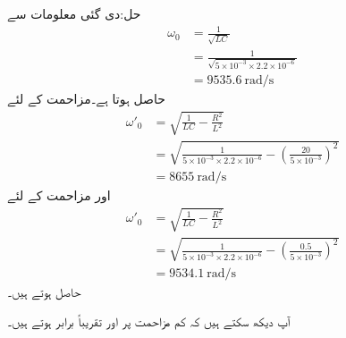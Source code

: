 حل:دی گئی معلومات سے
\begin{align*}
\omega_0&=\frac{1}{\sqrt{LC}}\\
&=\frac{1}{\sqrt{5\times 10^{-3} \times 2.2 \times 10^{-6}}}\\
&=\SI{9535.6}{\radian\per\second}
\end{align*}
حاصل ہوتا ہے۔مزاحمت  کے لئے
\begin{align*}
\omega'_0&=\sqrt{\frac{1}{LC}-\frac{R^2}{L^2}}\\
&=\sqrt{\frac{1}{5\times 10^{-3}\times 2.2 \times 10^{-6}} -\left(\frac{20}{5\times 10^{-3}}\right)^2}\\
&=\SI{8655}{\radian\per\second}
\end{align*}
اور مزاحمت  کے لئے
\begin{align*}
\omega'_0&=\sqrt{\frac{1}{LC}-\frac{R^2}{L^2}}\\
&=\sqrt{\frac{1}{5\times 10^{-3}\times 2.2 \times 10^{-6}} -\left(\frac{0.5}{5\times 10^{-3}}\right)^2}\\
&=\SI{9534.1}{\radian\per\second}
\end{align*}
حاصل ہوتے ہیں۔

آپ دیکھ سکتے ہیں کہ کم مزاحمت پر  اور  تقریباً برابر ہوتے ہیں۔

